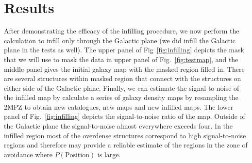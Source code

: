 \documentclass[useAMS,usenatbib]{mn2e}
\begin{document}
\section{Results}

After demonstrating the efficacy of the infilling procedure, we now
perform the calculation to infill only through the Galactic plane (we
did infill the Galactic plane in the tests as well).  The upper panel
of Fig~\ref{fig:infilling} depicts the mask that we will use to mask
the data in upper panel of Fig.~\ref{fig:testmap}, and the middle
panel gives the initial galaxy map with the masked region filled in.
There are several structures within masked region that connect with
the structures on either side of the Galactic plane.  Finally, we can
estimate the signal-to-noise of the infilled map by calculate a series
of galaxy density maps by resampling the 2MPZ to obtain new
catalogues, new maps and new infilled maps.  The lower panel of
Fig.~\ref{fig:infilling} depicts the signal-to-noise ratio of the map.
Outside of the Galactic plane the signal-to-noise almost everywhere
exceeds four.  In the infilled region most of the overdense structures
correspond to high signal-to-noise regions and therefore may provide a
reliable estimate of the regions in the zone of avoidance where
$P(\mathrm{Position})$ is large.
\end{document}
